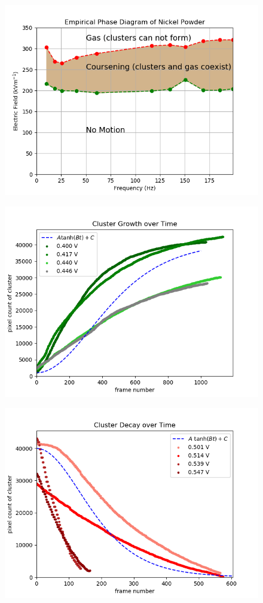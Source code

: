 \documentclass[8pt, a4paper]{article}
\begin{document}
\newpage
\begin{figure}[h]
\includegraphics{phased.png}
\end{figure}




\newpage
\begin{figure}[h]
\includegraphics{growth.png}
\end{figure}




\newpage
\begin{figure}[h]
\includegraphics{decay.png}
\end{figure}




\newpage

\end{document}
